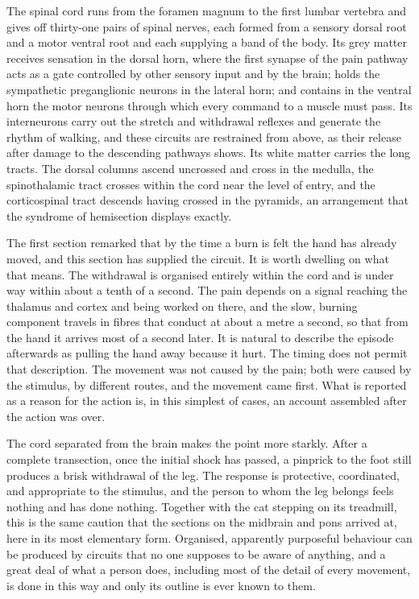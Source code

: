 \documentclass[11pt]{article}
\begin{document}
The spinal cord runs from the foramen magnum to the first lumbar vertebra and gives off thirty-one pairs of spinal nerves, each formed from a sensory dorsal root and a motor ventral root and each supplying a band of the body. Its grey matter receives sensation in the dorsal horn, where the first synapse of the pain pathway acts as a gate controlled by other sensory input and by the brain; holds the sympathetic preganglionic neurons in the lateral horn; and contains in the ventral horn the motor neurons through which every command to a muscle must pass. Its interneurons carry out the stretch and withdrawal reflexes and generate the rhythm of walking, and these circuits are restrained from above, as their release after damage to the descending pathways shows. Its white matter carries the long tracts. The dorsal columns ascend uncrossed and cross in the medulla, the spinothalamic tract crosses within the cord near the level of entry, and the corticospinal tract descends having crossed in the pyramids, an arrangement that the syndrome of hemisection displays exactly.

The first section remarked that by the time a burn is felt the hand has already moved, and this section has supplied the circuit. It is worth dwelling on what that means. The withdrawal is organised entirely within the cord and is under way within about a tenth of a second. The pain depends on a signal reaching the thalamus and cortex and being worked on there, and the slow, burning component travels in fibres that conduct at about a metre a second, so that from the hand it arrives most of a second later. It is natural to describe the episode afterwards as pulling the hand away because it hurt. The timing does not permit that description. The movement was not caused by the pain; both were caused by the stimulus, by different routes, and the movement came first. What is reported as a reason for the action is, in this simplest of cases, an account assembled after the action was over.

The cord separated from the brain makes the point more starkly. After a complete transection, once the initial shock has passed, a pinprick to the foot still produces a brisk withdrawal of the leg. The response is protective, coordinated, and appropriate to the stimulus, and the person to whom the leg belongs feels nothing and has done nothing. Together with the cat stepping on its treadmill, this is the same caution that the sections on the midbrain and pons arrived at, here in its most elementary form. Organised, apparently purposeful behaviour can be produced by circuits that no one supposes to be aware of anything, and a great deal of what a person does, including most of the detail of every movement, is done in this way and only its outline is ever known to them.
\end{document}
